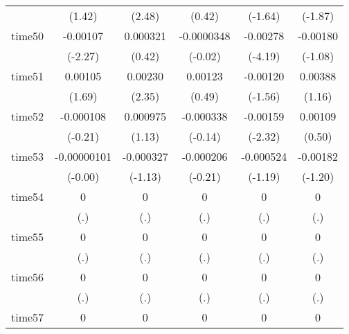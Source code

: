 \begin{table}[htbp]
\begin{tabular}{l*{5}{c}}
            &      (1.42)         &      (2.48)         &      (0.42)         &     (-1.64)         &     (-1.87)         \\
time50      &    -0.00107\sym{*}  &    0.000321         &  -0.0000348         &    -0.00278\sym{***}&    -0.00180         \\
            &     (-2.27)         &      (0.42)         &     (-0.02)         &     (-4.19)         &     (-1.08)         \\
time51      &     0.00105         &     0.00230\sym{*}  &     0.00123         &    -0.00120         &     0.00388         \\
            &      (1.69)         &      (2.35)         &      (0.49)         &     (-1.56)         &      (1.16)         \\
time52      &   -0.000108         &    0.000975         &   -0.000338         &    -0.00159\sym{*}  &     0.00109         \\
            &     (-0.21)         &      (1.13)         &     (-0.14)         &     (-2.32)         &      (0.50)         \\
time53      & -0.00000101         &   -0.000327         &   -0.000206         &   -0.000524         &    -0.00182         \\
            &     (-0.00)         &     (-1.13)         &     (-0.21)         &     (-1.19)         &     (-1.20)         \\
time54      &           0         &           0         &           0         &           0         &           0         \\
            &         (.)         &         (.)         &         (.)         &         (.)         &         (.)         \\
time55      &           0         &           0         &           0         &           0         &           0         \\
            &         (.)         &         (.)         &         (.)         &         (.)         &         (.)         \\
time56      &           0         &           0         &           0         &           0         &           0         \\
            &         (.)         &         (.)         &         (.)         &         (.)         &         (.)         \\
time57      &           0         &           0         &           0         &           0         &           0         \\

\end{tabular}
\end{table}
